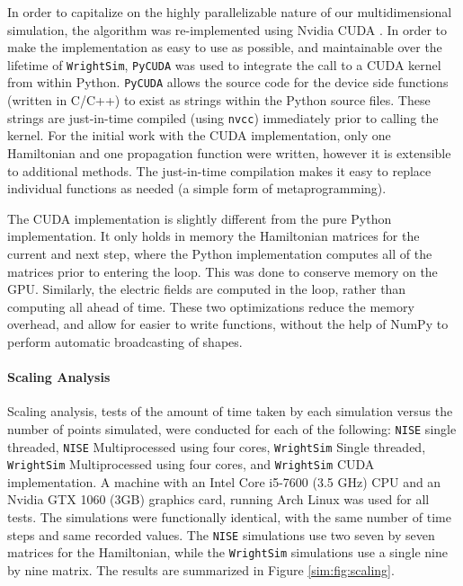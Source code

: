 In order to capitalize on the highly parallelizable nature of our
multidimensional simulation, the algorithm was re-implemented using
Nvidia CUDA \cite{Nickolls_2008}. In order to make the implementation
as easy to use as possible, and maintainable over the lifetime of
\texttt{WrightSim}, \texttt{PyCUDA} \cite{Klockner_2012} was used to
integrate the call to a CUDA kernel from within Python. \texttt{PyCUDA}
allows the source code for the device side functions (written in C/C++)
to exist as strings within the Python source files. These strings are
just-in-time compiled (using \texttt{nvcc}) immediately prior to calling
the kernel. For the initial work with the CUDA implementation, only one
Hamiltonian and one propagation function were written, however it is
extensible to additional methods. The just-in-time compilation makes it
easy to replace individual functions as needed (a simple form of
metaprogramming).

The CUDA implementation is slightly different from the pure Python
implementation. It only holds in memory the Hamiltonian matrices for the
current and next step, where the Python implementation computes all of
the matrices prior to entering the loop. This was done to conserve
memory on the GPU. Similarly, the electric fields are computed in the
loop, rather than computing all ahead of time. These two optimizations
reduce the memory overhead, and allow for easier to write functions,
without the help of NumPy to perform automatic broadcasting of shapes.

\hypertarget{scaling-analysis}{%
\paragraph{Scaling Analysis}\label{scaling-analysis}}

Scaling analysis, tests of the amount of time taken by each simulation
versus the number of points simulated, were conducted for each of the
following: \texttt{NISE} single threaded, \texttt{NISE} Multiprocessed
using four cores, \texttt{WrightSim} Single threaded, \texttt{WrightSim}
Multiprocessed using four cores, and \texttt{WrightSim} CUDA
implementation. A machine with an Intel Core i5-7600 (3.5 GHz) CPU and
an Nvidia GTX 1060 (3GB) graphics card, running Arch Linux was used for
all tests. The simulations were functionally identical, with the same
number of time steps and same recorded values. The \texttt{NISE}
simulations use two seven by seven matrices for the Hamiltonian, while
the \texttt{WrightSim} simulations use a single nine by nine matrix. The
results are summarized in Figure \ref{sim:fig:scaling}.

